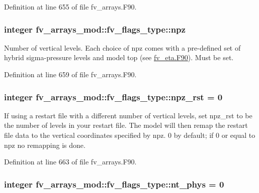 Definition at line 655 of file fv\-\_\-arrays.\-F90.

\subsubsection[{npz}]{\setlength{\rightskip}{0pt plus 5cm}integer fv\-\_\-arrays\-\_\-mod\-::fv\-\_\-flags\-\_\-type\-::npz}\label{structfv__arrays__mod_1_1fv__flags__type_a7cb0e06006a898845d3a6b1d92c7def6}


Number of vertical levels. Each choice of npz comes with a pre-\/defined set of hybrid sigma-\/pressure levels and model top (see \hyperlink{fv__eta_8F90}{fv\-\_\-eta.\-F90}). Must be set. 



Definition at line 659 of file fv\-\_\-arrays.\-F90.

\subsubsection[{npz\-\_\-rst}]{\setlength{\rightskip}{0pt plus 5cm}integer fv\-\_\-arrays\-\_\-mod\-::fv\-\_\-flags\-\_\-type\-::npz\-\_\-rst = 0}\label{structfv__arrays__mod_1_1fv__flags__type_a49de58ed8a38556bb4fe86c5601a4f64}


If using a restart file with a different number of vertical levels, set npz\-\_\-rst to be the number of levels in your restart file. The model will then remap the restart file data to the vertical coordinates specified by npz. 0 by default; if 0 or equal to npz no remapping is done. 



Definition at line 663 of file fv\-\_\-arrays.\-F90.

\subsubsection[{nt\-\_\-phys}]{\setlength{\rightskip}{0pt plus 5cm}integer fv\-\_\-arrays\-\_\-mod\-::fv\-\_\-flags\-\_\-type\-::nt\-\_\-phys = 0}\label{structfv__arrays__mod_1_1fv__flags__type_a968a2c7340ea986e3418793dcafb3810}


